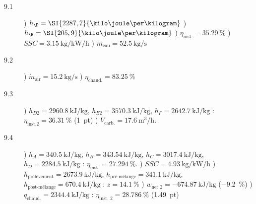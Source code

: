 	\begin{description}
		\item [9.1] ) $h_\D = \SI{2287,7}{\kilo\joule\per\kilogram} $ 
						) $h_\B = \SI{205,9}{\kilo\joule\per\kilogram} $ 
						) $\eta_\text{inst.} = \SI{35,29}{\percent}$ 
						) $SSC = \SI[per-mode = symbol]{3,15}{\kilogram\per\kilo\watt\per\hour}$ 
						) $\dot{m}_\text{eau} = \SI{52,5}{\kilogram\per\second}$
		\item [9.2] ) $\dot{m}_\text{air} = \SI{15,2}{\kilogram\per\second}$ 
						) $\eta_\text{chaud.} = \SI{83,25}{\percent}$
		\item [9.3] ) $h_{D2} = \SI{2960,8}{\kilo\joule\per\kilogram}$, $h_{E2} = \SI{3570,3}{\kilo\joule\per\kilogram}$, $h_{F} = \SI{2642,7}{\kilo\joule\per\kilogram}$ : $\eta_\text{inst.2} = \SI{36,31}{\percent}$ (\SI{+1}{pt})
						) $\dot{V}_\text{carb.} = \SI{17,6}{\metre\cubed\per\hour}$.
		\item [9.4] ) $h_{A} = \SI{340,5}{\kilo\joule\per\kilogram}$, $h_{B} = \SI{343,54}{\kilo\joule\per\kilogram}$, $h_{C} = \SI{3017,4}{\kilo\joule\per\kilogram}$, $h_{D} = \SI{2284,5}{\kilo\joule\per\kilogram}$ : $\eta_\text{inst.} = \SI{27,294}{\percent}$. 
						) $SSC = \SI[per-mode = symbol]{4,93}{\kilogram\per\kilo\watt\per\hour}$ 
						) $h_\text{prélèvement} = \SI{2673,9}{\kilo\joule\per\kilogram}$, $h_\text{pré-mélange} = \SI{341,1}{\kilo\joule\per\kilogram}$, $h_\text{post-mélange} = \SI{670,4}{\kilo\joule\per\kilogram}$ : $z = \SI{14,1}{\percent}$
						) $w_\text{net~2} = \SI{-674,87}{\kilo\joule\per\kilogram}$ (\SI{-9,2}{\percent}) 
						) $q_\text{chaud.} = \SI{2344,4}{\kilo\joule\per\kilogram}$ : $\eta_\text{inst.~2} = \SI{28,786}{\percent}$ (\SI{+1,49}{pt})
	\end{description}
